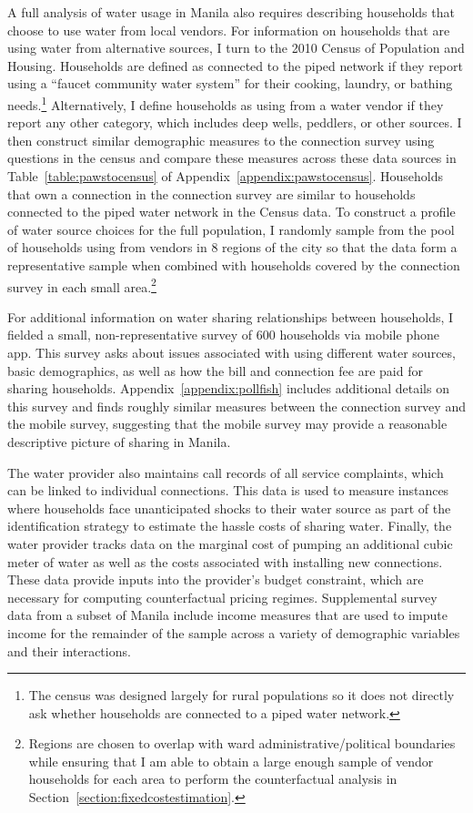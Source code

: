 \documentclass[12pt]{article}
\begin{document}
A full analysis of water usage in Manila also requires describing households that choose to use water from local vendors.  For information on households that are using water from alternative sources, I turn to the 2010 Census of Population and Housing.  Households are defined as connected to the piped network if they report using a ``faucet community water system'' for their cooking, laundry, or bathing needs.\footnote{The census was designed largely for rural populations so it does not directly ask whether households are connected to a piped water network.}  Alternatively, I define households as using from a water vendor if they report any other category, which includes deep wells, peddlers, or other sources.  I then construct similar demographic measures to the connection survey using questions in the census and compare these measures across these data sources in Table~\ref{table:pawstocensus} of Appendix~\ref{appendix:pawstocensus}.  Households that own a connection in the connection survey are similar to households connected to the piped water network in the Census data.  To construct a profile of water source choices for the full population, I randomly sample from the pool of households using from vendors in 8 regions of the city so that the data form a representative sample when combined with households covered by the connection survey in each small area.\footnote{Regions are chosen to overlap with ward administrative/political boundaries while ensuring that I am able to obtain a large enough sample of vendor households for each area to perform the counterfactual analysis in Section~\ref{section:fixedcostestimation}.}

For additional information on water sharing relationships between households, I fielded a small, non-representative survey of 600 households via mobile phone app.  This survey asks about issues associated with using different water sources, basic demographics, as well as how the bill and connection fee are paid for sharing households.  Appendix~\ref{appendix:pollfish} includes additional details on this survey and finds roughly similar measures between the connection survey and the mobile survey, suggesting that the mobile survey may provide a reasonable descriptive picture of sharing in Manila.

The water provider also maintains call records of all service complaints, which can be linked to individual connections.  This data is used to measure instances where households face unanticipated shocks to their water source as part of the identification strategy to estimate the hassle costs of sharing water.  Finally, the water provider tracks data on the marginal cost of pumping an additional cubic meter of water as well as the costs associated with installing new connections.  These data provide inputs into the provider's budget constraint, which are necessary for computing counterfactual pricing regimes.  Supplemental survey data from a subset of Manila include income measures that are used to impute income for the remainder of the sample across a variety of demographic variables and their interactions.
\end{document}
